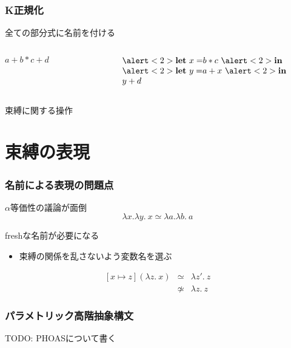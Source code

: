 \documentclass[dvipdfmx,cjk,xcolor=dvipsnames,envcountsect,notheorems,12pt]{beamer}
\theoremstyle{definition}
\newcommand{\keyword}[1]{\mathbf{#1}}
\newcommand{\LET}{\keyword{let}}
\newcommand{\IN}{\keyword{in}}
\begin{document}
\begin{frame}
	\frametitle{K正規化}
	\LARGE
	全ての部分式に名前を付ける

	\begin{columns}
		\begin{column}{0.5\textwidth}
			\begin{center}
				$a+b*c+d$
			\end{center}
		\end{column}
		\begin{column}{0.5\textwidth}
			\begin{center}
				\[
					\begin{array}{l}
						\alert<2>{\LET~x =} b * c~\alert<2>{\IN} \\
						\alert<2>{\LET~y =} a + x~\alert<2>{\IN} \\
						y + d
					\end{array}
				\]
			\end{center}
		\end{column}
	\end{columns}

	\vfill

	\alert<2>{束縛に関する操作}
	\pause
\end{frame}

\section{束縛の表現}

\begin{frame}
	\frametitle{名前による表現の問題点}
	\LARGE $\alpha$等価性の議論が面倒
	\[ \lambda x.\lambda y.~x \simeq \lambda a.\lambda b.~a \]

	\vfill

	freshな名前が必要になる
	\begin{itemize}
		\item 束縛の関係を乱さないよう変数名を選ぶ
	\end{itemize}
	\[
		\begin{array}{lcl}
			[x \mapsto z](\lambda z.~x) & \simeq & \lambda z'.~z \\
																	& \not \simeq & \lambda z.~z
		\end{array}
	\]
\end{frame}

\begin{frame}
	\frametitle{パラメトリック高階抽象構文}
	TODO: PHOASについて書く
\end{frame}
\end{document}
